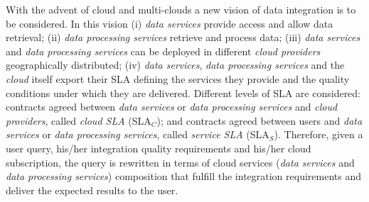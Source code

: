 With the advent of cloud and multi-clouds a new vision of data integration is to be considered.
In this vision 
(i) \textit{data services} provide access and allow data retrieval;  
(ii) \textit{data processing services} retrieve and process data; 
(iii) \textit{data services} and \textit{data processing services} can be deployed in different \textit{cloud providers} geographically distributed; 
(iv) \textit{data services}, \textit{data processing services} and the \textit{cloud} itself export their SLA defining the services they provide and the quality conditions under which they are delivered. Different levels of SLA are considered: contracts agreed between \textit{data services} or \textit{data processing services} and \textit{cloud providers}, called \textit{cloud SLA} (SLA$_{C}$); and contracts agreed between users and \textit{data services} or \textit{data processing services}, called \textit{service SLA} (SLA$_{S}$). 
Therefore, given a user query, his/her integration quality requirements and his/her cloud subscription, the query is rewritten in terms of cloud services (\textit{data services} and \textit{data processing services}) composition that fulfill the integration requirements and deliver the expected results to the user.


